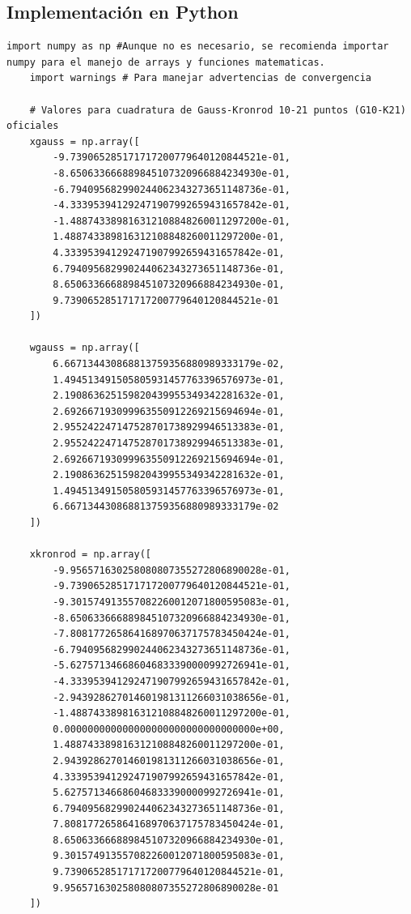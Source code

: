 \documentclass{article}
\begin{document}
\subsection{Implementación en Python}
\begin{lstlisting}[caption={Implementación de la integración adaptativa con cuadratura Gauss-Kronrod}]
    import numpy as np #Aunque no es necesario, se recomienda importar numpy para el manejo de arrays y funciones matematicas.
    import warnings # Para manejar advertencias de convergencia
    
    # Valores para cuadratura de Gauss-Kronrod 10-21 puntos (G10-K21) oficiales
    xgauss = np.array([
        -9.739065285171717200779640120844521e-01,
        -8.650633666889845107320966884234930e-01,
        -6.794095682990244062343273651148736e-01,
        -4.333953941292471907992659431657842e-01,
        -1.488743389816312108848260011297200e-01,
        1.488743389816312108848260011297200e-01,
        4.333953941292471907992659431657842e-01,
        6.794095682990244062343273651148736e-01,
        8.650633666889845107320966884234930e-01,
        9.739065285171717200779640120844521e-01
    ])

    wgauss = np.array([
        6.667134430868813759356880989333179e-02,
        1.494513491505805931457763396576973e-01,
        2.190863625159820439955349342281632e-01,
        2.692667193099963550912269215694694e-01,
        2.955242247147528701738929946513383e-01,
        2.955242247147528701738929946513383e-01,
        2.692667193099963550912269215694694e-01,
        2.190863625159820439955349342281632e-01,
        1.494513491505805931457763396576973e-01,
        6.667134430868813759356880989333179e-02
    ])

    xkronrod = np.array([
        -9.956571630258080807355272806890028e-01,
        -9.739065285171717200779640120844521e-01,
        -9.301574913557082260012071800595083e-01,
        -8.650633666889845107320966884234930e-01,
        -7.808177265864168970637175783450424e-01,
        -6.794095682990244062343273651148736e-01,
        -5.627571346686046833390000992726941e-01,
        -4.333953941292471907992659431657842e-01,
        -2.943928627014601981311266031038656e-01,
        -1.488743389816312108848260011297200e-01,
        0.000000000000000000000000000000000e+00,
        1.488743389816312108848260011297200e-01,
        2.943928627014601981311266031038656e-01,
        4.333953941292471907992659431657842e-01,
        5.627571346686046833390000992726941e-01,
        6.794095682990244062343273651148736e-01,
        7.808177265864168970637175783450424e-01,
        8.650633666889845107320966884234930e-01,
        9.301574913557082260012071800595083e-01,
        9.739065285171717200779640120844521e-01,
        9.956571630258080807355272806890028e-01
    ])


\end{lstlisting}
\end{document}
